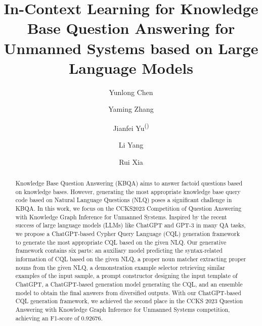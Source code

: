\documentclass[runningheads]{llncs}
\begin{document}
\title{In-Context Learning for Knowledge Base Question Answering for Unmanned Systems based on Large Language Models}
%
%
\author{
    Yunlong Chen \and
    Yaming Zhang \and
    Jianfei Yu\textsuperscript{(\Letter)} \and
    Li Yang \and
    Rui Xia
}
%
%
%
\maketitle              %


\begin{abstract}
Knowledge Base Question Answering (KBQA) aims to answer factoid questions based on knowledge bases. 
However, generating the most appropriate knowledge base query code based on Natural Language Questions (NLQ) poses a significant challenge in KBQA.
In this work, we focus on the CCKS2023 Competition of Question Answering with Knowledge Graph Inference for Unmanned Systems.
Inspired by the recent success of large language models (LLMs) like ChatGPT and GPT-3 in many QA tasks, we propose a ChatGPT-based Cypher Query Language (CQL) generation framework to generate the most appropriate CQL based on the given NLQ.
Our generative framework contains six parts: 
an auxiliary model predicting the syntax-related information of CQL based on the given NLQ, 
a proper noun matcher extracting proper nouns from the given NLQ, 
a demonstration example selector retrieving similar examples of the input sample,
a prompt constructor designing the input template of ChatGPT, 
a ChatGPT-based generation model generating the CQL, 
and an ensemble model to obtain the final answers from diversified outputs.
With our ChatGPT-based CQL generation framework, we achieved the second place in the CCKS 2023 Question Answering with Knowledge Graph Inference for Unmanned Systems competition, achieving an F1-score of 0.92676.

\end{abstract}
\end{document}
